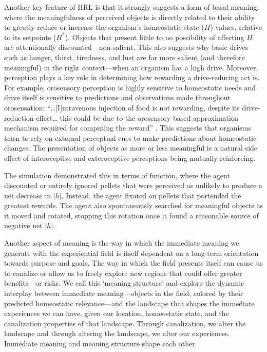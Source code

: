 Another key feature of HRL is that it strongly suggests a form of basal meaning, where the meaningfulness of perceived objects is directly related to their ability to greatly reduce or increase the organism's homeostatic state (\(H\)) values, relative to its setpoints (\(H^*\)). Objects that present little to no possibility of affecting \(H\) are attentionally discounted—non-salient. This also suggests why basic drives such as hunger, thirst, tiredness, and lust are far more salient (and therefore meaningful) in the right context—when an organism has a high drive. Moreover, perception plays a key role in determining how rewarding a drive-reducing act is. For example, orosensory perception is highly sensitive to homeostatic needs and drive itself is sensitive to predictions and observations made throughout orosensation: “…[I]ntravenous injection of food is not rewarding, despite its drive-reduction effect… this could be due to the orosensory-based approximation mechanism required for computing the reward” \parencite{keramati_homeostatic_2014}. This suggests that organisms learn to rely on external perceptual cues to make predictions about homeostatic changes. The presentation of objects as more or less meaningful is a natural side effect of interoceptive and exteroceptive perceptions being mutually reinforcing.

The simulation demonstrated this in terms of function, where the agent discounted or entirely ignored pellets that were perceived as unlikely to produce a net decrease in \(|h|\). Instead, the agent fixated on pellets that portended the greatest rewards. The agent also spontaneously searched for meaningful objects as it moved and rotated, stopping this rotation once it found a reasonable source of negative net \(|h|\). 

Another aspect of meaning is the way in which the immediate meaning we generate with the experiential field is itself dependent on a long-term orientation towards purpose and goals. The way in which the field presents itself can cause us to canalize or allow us to freely explore new regions that could offer greater benefits—or risks. We call this ‘meaning structure’ and explore the dynamic interplay between immediate meaning—objects in the field, colored by their predicted homeostatic relevance—and the landscape that shapes the immediate experiences we can have, given our location, homeostatic state, and the canalization properties of that landscape. Through canalization, we alter the landscape and through altering the landscape, we alter our experiences. Immediate meaning and meaning structure shape each other. 
